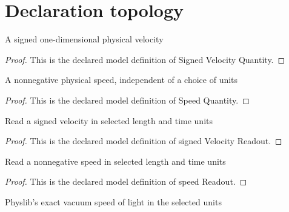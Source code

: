 \section{Declaration topology}
\begin{definition}
  \label{def:physics:phyx-mini-0547:phyxminiproblems-problemphyxmini0547-signedvelocityquantity}
  A signed one-dimensional physical velocity
\end{definition}
\begin{proof}
  This is the declared model definition of Signed Velocity Quantity.
\end{proof}
\begin{definition}
  \label{def:physics:phyx-mini-0547:phyxminiproblems-problemphyxmini0547-speedquantity}
  A nonnegative physical speed, independent of a choice of units
\end{definition}
\begin{proof}
  This is the declared model definition of Speed Quantity.
\end{proof}
\begin{definition}
  \label{def:physics:phyx-mini-0547:phyxminiproblems-problemphyxmini0547-signedvelocityreadout}
  Read a signed velocity in selected length and time units
\end{definition}
\begin{proof}
  This is the declared model definition of signed Velocity Readout.
\end{proof}
\begin{definition}
  \label{def:physics:phyx-mini-0547:phyxminiproblems-problemphyxmini0547-speedreadout}
  Read a nonnegative speed in selected length and time units
\end{definition}
\begin{proof}
  This is the declared model definition of speed Readout.
\end{proof}
\begin{definition}
  \label{def:physics:phyx-mini-0547:phyxminiproblems-problemphyxmini0547-vacuumspeedoflightreadout}
  Physlib's exact vacuum speed of light in the selected units
\end{definition}
